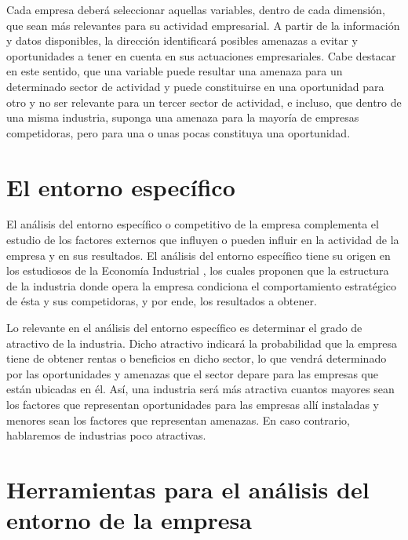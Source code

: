 \documentclass[
]{krantz}
\begin{document}
Cada empresa deberá seleccionar aquellas variables, dentro de cada dimensión, que sean más relevantes para su actividad empresarial. A partir de la información y datos disponibles, la dirección identificará posibles amenazas a evitar y oportunidades a tener en cuenta en sus actuaciones empresariales. Cabe destacar en este sentido, que una variable puede resultar una amenaza para un determinado sector de actividad y puede constituirse en una oportunidad para otro y no ser relevante para un tercer sector de actividad, e incluso, que dentro de una misma industria, suponga una amenaza para la mayoría de empresas competidoras, pero para una o unas pocas constituya una oportunidad.

\hypertarget{el-entorno-especuxedfico}{%
\section{El entorno específico}\label{el-entorno-especuxedfico}}

El análisis del entorno específico o competitivo de la empresa complementa el estudio de los factores externos que influyen o pueden influir en la actividad de la empresa y en sus resultados. El análisis del entorno específico tiene su origen en los estudiosos de la Economía Industrial \citep{bain1958}, los cuales proponen que la estructura de la industria donde opera la empresa condiciona el comportamiento estratégico de ésta y sus competidoras, y por ende, los resultados a obtener.

Lo relevante en el análisis del entorno específico es determinar el grado de atractivo de la industria. Dicho atractivo indicará la probabilidad que la empresa tiene de obtener rentas o beneficios en dicho sector, lo que vendrá determinado por las oportunidades y amenazas que el sector depare para las empresas que están ubicadas en él. Así, una industria será más atractiva cuantos mayores sean los factores que representan oportunidades para las empresas allí instaladas y menores sean los factores que representan amenazas. En caso contrario, hablaremos de industrias poco atractivas.

\hypertarget{herramientas-para-el-anuxe1lisis-del-entorno-de-la-empresa}{%
\section{Herramientas para el análisis del entorno de la empresa}\label{herramientas-para-el-anuxe1lisis-del-entorno-de-la-empresa}}
\end{document}
